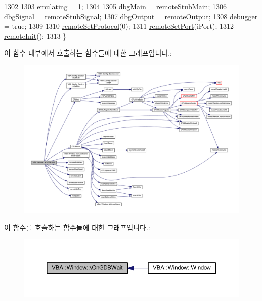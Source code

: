 \begin{DoxyCode}
1302 
1303   \mbox{\hyperlink{gb_globals_8h_af9cc36078b1b311753963297ae7f2a74}{emulating}} = 1;
1304 
1305   \mbox{\hyperlink{windowcallbacks_8cpp_a2a73601d4d24ff6d902f4e6b4c7b06fe}{dbgMain}}   = \mbox{\hyperlink{windowcallbacks_8cpp_a3fc86793182abde32b75da7885cb7337}{remoteStubMain}};
1306   \mbox{\hyperlink{windowcallbacks_8cpp_aaa0130c668d61033a5012af849b1fead}{dbgSignal}} = \mbox{\hyperlink{windowcallbacks_8cpp_a5309cd8c07c439a8edfa790743175a19}{remoteStubSignal}};
1307   \mbox{\hyperlink{windowcallbacks_8cpp_ae5aca87b107fd7cb9c29c6489cf438ac}{dbgOutput}} = \mbox{\hyperlink{windowcallbacks_8cpp_a2e3d3e94a2ed5eb4ad78a320f24ca743}{remoteOutput}};
1308   \mbox{\hyperlink{windowcallbacks_8cpp_af67e2df4c66ef114f4edb85c06810007}{debugger}}  = \textcolor{keyword}{true};
1309 
1310   \mbox{\hyperlink{windowcallbacks_8cpp_ae12004b9afc1b49d9f40d3efb5862c81}{remoteSetProtocol}}(0);
1311   \mbox{\hyperlink{windowcallbacks_8cpp_a0753bdc2e948e3b0bf452e8183c74dfd}{remoteSetPort}}(iPort);
1312   \mbox{\hyperlink{windowcallbacks_8cpp_a9f014181ce9f2daee148f90876f6b86a}{remoteInit}}();
1313 \}
\end{DoxyCode}
이 함수 내부에서 호출하는 함수들에 대한 그래프입니다.\+:
\nopagebreak
\begin{figure}[H]
\begin{center}
\leavevmode
\includegraphics[width=350pt]{class_v_b_a_1_1_window_a35c038f07a5ea91103c5e05b82b8bd0b_cgraph}
\end{center}
\end{figure}
이 함수를 호출하는 함수들에 대한 그래프입니다.\+:
\nopagebreak
\begin{figure}[H]
\begin{center}
\leavevmode
\includegraphics[width=350pt]{class_v_b_a_1_1_window_a35c038f07a5ea91103c5e05b82b8bd0b_icgraph}
\end{center}
\end{figure}
